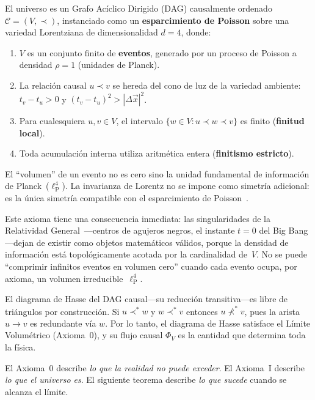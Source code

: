 \documentclass[11pt, a4paper, openany]{book}
\newcommand{\lP}{\ell_{\mathrm{P}}}
\newcommand{\covers}{\prec^{\!*}}
\begin{document}
\begin{axiom}
\label{def:event}
El universo es un Grafo Ac\'iclico Dirigido (DAG) causalmente
ordenado~\cite{bombelli1987,myrheim1978}
$\mathcal{C} = (V, \prec)$, instanciado como un \textbf{esparcimiento
de Poisson} sobre una variedad Lorentziana de dimensionalidad $d = 4$,
donde:
\begin{enumerate}
  \item $V$ es un conjunto finito de \textbf{eventos}, generado por un
        proceso de Poisson a densidad $\rho = 1$ (unidades de Planck).
  \item La relaci\'on causal $u \prec v$ se hereda del cono de luz de la
        variedad ambiente: $t_v - t_u > 0$ y
        $(t_v - t_u)^2 > |\Delta\vec{x}|^2$.
  \item Para cualesquiera $u, v \in V$, el intervalo
        $\{w \in V : u \prec w \prec v\}$ es finito
        (\textbf{finitud local}).
  \item Toda acumulaci\'on interna utiliza aritm\'etica entera
        (\textbf{finitismo estricto}).
\end{enumerate}
El ``volumen'' de un evento no es cero sino la unidad fundamental de
informaci\'on de Planck~($\lP^4$).  La invarianza de Lorentz no se
impone como simetr\'ia adicional: es la \'unica simetr\'ia compatible
con el esparcimiento de Poisson~\cite{bombelli2009}.
\end{axiom}

\noindent
Este axioma tiene una consecuencia inmediata: las singularidades
de la Relatividad General~\cite{penrose1965,hawking1973}---centros de
agujeros negros, el instante $t = 0$ del Big Bang---dejan de existir
como objetos matem\'aticos v\'alidos, porque la densidad de informaci\'on est\'a topol\'ogicamente
acotada por la cardinalidad de~$V$. No se puede ``comprimir infinitos
eventos en volumen cero'' cuando cada evento ocupa, por axioma, un
volumen irreducible~$\lP^4$.

El diagrama de Hasse del DAG causal---su reducci\'on
transitiva---es libre de tri\'angulos por construcci\'on. Si
$u \covers w$ y $w \covers v$ entonces $u \not\covers v$, pues la
arista $u \to v$ es redundante v\'ia $w$. Por lo tanto, el diagrama de
Hasse satisface el L\'imite Volum\'etrico (Axioma~0), y su flujo causal
$\Phi_V$ es la cantidad que determina toda la f\'isica.

El Axioma~0 describe \emph{lo que la realidad no puede exceder}. El
Axioma~I describe \emph{lo que el universo es}. El siguiente teorema
describe \emph{lo que sucede} cuando se alcanza el l\'imite.
\end{document}
